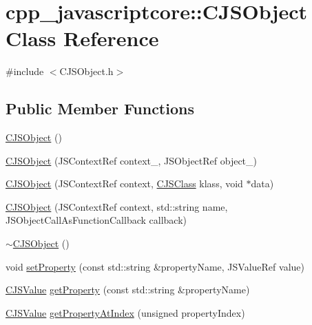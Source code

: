 \hypertarget{classcpp__javascriptcore_1_1_c_j_s_object}{}\section{cpp\+\_\+javascriptcore\+:\+:C\+J\+S\+Object Class Reference}
\label{classcpp__javascriptcore_1_1_c_j_s_object}


{\ttfamily \#include $<$C\+J\+S\+Object.\+h$>$}

\subsection*{Public Member Functions}
\begin{DoxyCompactItemize}
\item 
\mbox{\hyperlink{classcpp__javascriptcore_1_1_c_j_s_object_a66d2176f271cac5329dcfe1885fffcb5}{C\+J\+S\+Object}} ()
\item 
\mbox{\hyperlink{classcpp__javascriptcore_1_1_c_j_s_object_a82cc772b6e660f7144ffef04a0e80eef}{C\+J\+S\+Object}} (J\+S\+Context\+Ref context\+\_\+, J\+S\+Object\+Ref object\+\_\+)
\item 
\mbox{\hyperlink{classcpp__javascriptcore_1_1_c_j_s_object_aa196c8d35a43a1dc1943272e9ff60eac}{C\+J\+S\+Object}} (J\+S\+Context\+Ref context, \mbox{\hyperlink{classcpp__javascriptcore_1_1_c_j_s_class}{C\+J\+S\+Class}} klass, void $\ast$data)
\item 
\mbox{\hyperlink{classcpp__javascriptcore_1_1_c_j_s_object_ac62f1a0512ae5ee95a996b903ee6516a}{C\+J\+S\+Object}} (J\+S\+Context\+Ref context, std\+::string name, J\+S\+Object\+Call\+As\+Function\+Callback callback)
\item 
\mbox{\hyperlink{classcpp__javascriptcore_1_1_c_j_s_object_a7c0d8cecca3ccf55a1cf667c9b8b3135}{$\sim$\+C\+J\+S\+Object}} ()
\item 
void \mbox{\hyperlink{classcpp__javascriptcore_1_1_c_j_s_object_a203fbfb9f14e8b8eb4929b59e9908ede}{set\+Property}} (const std\+::string \&property\+Name, J\+S\+Value\+Ref value)
\item 
\mbox{\hyperlink{classcpp__javascriptcore_1_1_c_j_s_value}{C\+J\+S\+Value}} \mbox{\hyperlink{classcpp__javascriptcore_1_1_c_j_s_object_aac86591daacf1f5ec00410c555114269}{get\+Property}} (const std\+::string \&property\+Name)
\item 
\mbox{\hyperlink{classcpp__javascriptcore_1_1_c_j_s_value}{C\+J\+S\+Value}} \mbox{\hyperlink{classcpp__javascriptcore_1_1_c_j_s_object_a192a51aa3a62858363c935c941dc38ab}{get\+Property\+At\+Index}} (unsigned property\+Index)

\end{DoxyCompactItemize}
